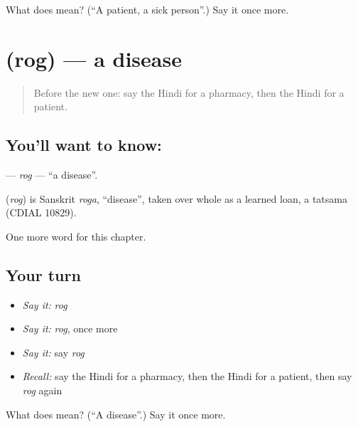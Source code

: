 \begin{tcolorbox}[breakable,colback=teal!4,colframe=teal!35!black,title={Before you move on}]
What does  mean? (\textquotedblleft{}A patient, a sick person\textquotedblright{}.) Say it once more.
\end{tcolorbox}
\section[\texorpdfstring{\hi{रोग} (rog)}{रोग (rog)}]{ (rog) — a disease}

\label{lesson:HI-C273-rog}



\begin{quote}
Before the new one: say the Hindi for a pharmacy, then the Hindi for a patient.
\end{quote}

\subsection*{You'll want to know: }
\textbf{} — \emph{rog} — \textquotedblleft{}a disease\textquotedblright{}.

\begin{cousinweb}
\textbf{} (\emph{rog}) is Sanskrit \emph{roga}, \textquotedblleft{}disease\textquotedblright{}, taken over whole as a learned loan, a tatsama (CDIAL 10829).
\end{cousinweb}

\begin{grammarlens}[title={What you've built}]
One more word for this chapter.
\end{grammarlens}

\subsection*{Your turn}
\begin{itemize}
\raggedright
  \item \emph{Say it:} \emph{rog}
  \item \emph{Say it:} \emph{rog}, once more
  \item \emph{Say it:} say \emph{rog}
  \item \emph{Recall:} say the Hindi for a pharmacy, then the Hindi for a patient, then say \emph{rog} again
\end{itemize}

\begin{tcolorbox}[breakable,colback=teal!4,colframe=teal!35!black,title={Before you move on}]
What does  mean? (\textquotedblleft{}A disease\textquotedblright{}.) Say it once more.
\end{tcolorbox}
